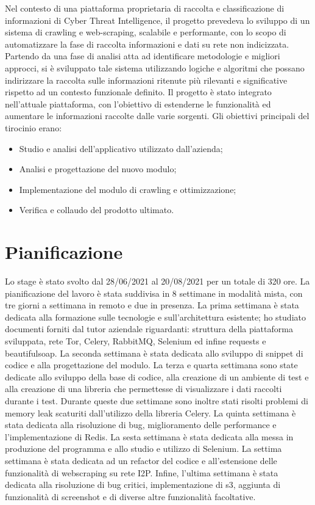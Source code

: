 Nel contesto di una piattaforma proprietaria di raccolta e classificazione di informazioni di Cyber Threat Intelligence, il progetto prevedeva lo sviluppo di un sistema di crawling e web-scraping, scalabile e performante, con lo scopo di automatizzare la fase di raccolta informazioni e dati su rete non indicizzata. Partendo da una fase di analisi atta ad identificare metodologie e migliori approcci, si è sviluppato tale sistema utilizzando logiche e algoritmi che possano indirizzare la raccolta sulle informazioni ritenute più rilevanti e significative rispetto ad un contesto funzionale definito.\newline{}
Il progetto è stato integrato nell'attuale piattaforma, con l'obiettivo di estenderne le funzionalità ed aumentare le informazioni raccolte dalle varie sorgenti.\newline{} Gli obiettivi principali del tirocinio erano: \newline{}
\begin{itemize}
	\item Studio e analisi dell'applicativo utilizzato dall’azienda;
	\item Analisi e progettazione del nuovo modulo;
	\item Implementazione del modulo di crawling e ottimizzazione;
	\item Verifica e collaudo del prodotto ultimato.
\end{itemize}
\section{Pianificazione}
Lo stage è stato svolto dal 28/06/2021 al 20/08/2021 per un totale di 320 ore. La pianificazione del lavoro è stata suddivisa in 8 settimane in modalità mista, con tre giorni a settimana in remoto e due in presenza. La prima settimana è stata dedicata alla formazione sulle tecnologie e sull'architettura esistente; ho studiato documenti forniti dal tutor aziendale riguardanti: struttura della piattaforma sviluppata, rete Tor, Celery, RabbitMQ, Selenium ed infine requests e beautifulsoap.\newline{}
La seconda settimana è stata dedicata allo sviluppo di snippet di codice e alla progettazione del modulo. \newline{}
La terza e quarta settimana sono state dedicate allo sviluppo della base di codice, alla creazione di un ambiente di test e alla creazione di una libreria che permettesse di visualizzare i dati raccolti durante i test. Durante queste due settimane sono inoltre stati risolti problemi di memory leak scaturiti dall'utilizzo della libreria Celery.
La quinta settimana è stata dedicata alla risoluzione di bug, miglioramento delle performance e l'implementazione di Redis.
La sesta settimana è stata dedicata alla messa in produzione del programma e allo studio e utilizzo di Selenium.
La settima settimana è stata dedicata ad un refactor del codice e all'estensione delle funzionalità di webscraping su rete I2P.
Infine, l'ultima settimana è stata dedicata alla risoluzione di bug critici, implementazione di s3, aggiunta di funzionalità di screenshot e di diverse altre funzionalità facoltative.


